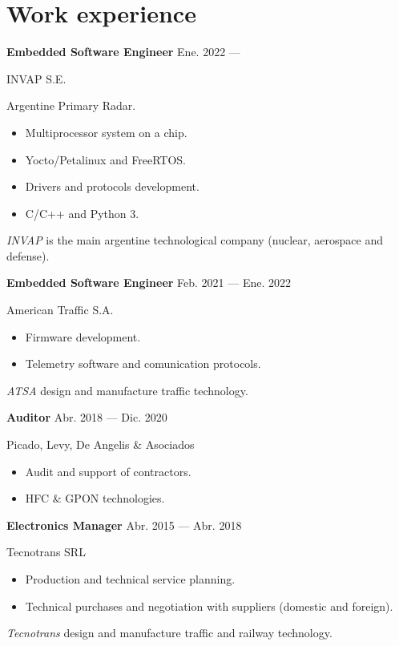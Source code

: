 \section{Work experience}


\parbox[t][][t]{\linewidth}{
	\parbox{\linewidth}{
		\textbf{Embedded Software Engineer}
			\hfill
			{Ene. 2022 --- \phantom{Dic. 2099}}
		}
	\smallbreak
	\parbox{\linewidth}{INVAP S.E.}
	\smallbreak
	Argentine Primary Radar.
	\begin{itemize}
	    \item{Multiprocessor system on a chip.}
		\item{Yocto/Petalinux and FreeRTOS.}
		\item{Drivers and protocols development.}
		\item{C/C++ and Python 3.}
	\end{itemize}
	\smallbreak
    \emph{INVAP} is the main argentine technological company (nuclear, aerospace and defense).
}

\bigskip
\parbox[t][][t]{\linewidth}{
	\parbox{\linewidth}{
		\textbf{Embedded Software Engineer}
			\hfill
			{Feb. 2021 --- Ene. 2022}
		}
	\smallbreak
	\parbox{\linewidth}{American Traffic S.A.}
	\smallbreak
	\begin{itemize}
	    \item{Firmware development.}
	    \item{Telemetry software and comunication protocols.}
	\end{itemize}
	\smallbreak
    \emph{ATSA} design and manufacture traffic technology.
}

\bigskip
\parbox[t][][t]{\linewidth}{
	\parbox{\linewidth}{
		\textbf{Auditor}
			\hfill
			{Abr. 2018 --- Dic. 2020}
		}
	\smallbreak
	\parbox{\linewidth}{Picado, Levy, De Angelis \& Asociados}
	\smallbreak
	\begin{itemize}
	    \item{Audit and support of contractors.}
	    \item{HFC \& GPON technologies.}
	\end{itemize}
	\smallbreak
}

\bigskip
\parbox[t][][t]{\linewidth}{
	{\parbox{\linewidth}{
		\parbox{\linewidth}{
			\textbf{Electronics Manager}
			\hfill
			{Abr. 2015 --- Abr. 2018}
		}
	}}
	\smallbreak
	\parbox{\linewidth}{Tecnotrans SRL}
	\smallbreak
	\begin{itemize}
	    \item{Production and technical service planning.}
	    \item{Technical purchases and negotiation with suppliers (domestic and foreign).}
	\end{itemize}
	\smallbreak
	\emph{Tecnotrans} design and manufacture traffic and railway technology.
}

